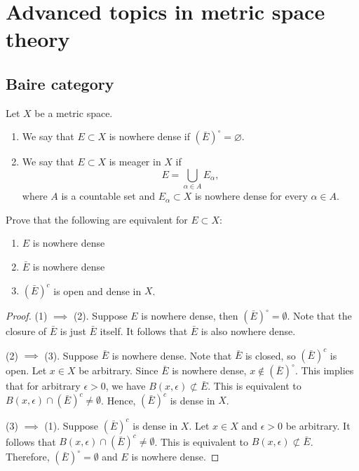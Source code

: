 \documentclass[a4paper]{article}
\begin{document}
\maketitle

\tableofcontents

\section{Advanced topics in metric space theory}

\subsection{Baire category}

\begin{defi}
Let $X$ be a metric space.
\begin{enumerate}
 \item We say that $E \subset X$ is nowhere dense if
 $(\bar{E})^\circ = \varnothing$.
 \item We say that $E \subset X$ is meager in $X$ if
\begin{equation*}
 E = \bigcup_{\alpha \in A} E_\alpha,
\end{equation*}
where $A$ is a countable set and $E_\alpha \subset X$
is nowhere dense for every $\alpha \in A$.
\end{enumerate}
\end{defi}

\begin{thm}
Prove that the following are equivalent for
$E \subset X$:
\begin{enumerate}
 \item $E$ is nowhere dense
 \item $\bar{E}$ is nowhere dense
 \item $(\bar{E})^c$ is open and dense in $X$.
\end{enumerate}
\end{thm}

\begin{proof}
  (1) $\implies$ (2). Suppose $E$ is nowhere dense, then
  $(\bar{E})^\circ = \emptyset$. Note that the closure
  of $\bar{E}$ is just $\bar{E}$ itself. It follows that
  $\bar{E}$ is also nowhere dense.

  (2) $\implies$ (3). Suppose $\bar{E}$ is nowhere dense.
  Note that $\bar{E}$ is closed, so $(\bar{E})^c$ is open.
  Let $x \in X$ be arbitrary. Since $\bar{E}$ is nowhere dense,
  $x \notin (\bar{E})^\circ$. This implies that for arbitrary
  $\epsilon > 0$, we have $B(x, \epsilon) \nsubset \bar{E}$.
  This is equivalent to $B(x, \epsilon) \cap (\bar{E})^c \neq
  \emptyset$. Hence, $(\bar{E})^c$ is dense in $X$.

  (3) $\implies$ (1). Suppose $(\bar{E})^c$ is dense in $X$.
  Let $x \in X$ and $\epsilon > 0$ be arbitrary. It follows
  that $B(x, \epsilon) \cap (\bar{E})^c \neq \emptyset$.
  This is equivalent to $B(x, \epsilon) \nsubset \bar{E}$.
  Therefore, $(\bar{E})^\circ = \emptyset$ and $E$ is nowhere
  dense.

\end{proof}
\end{document}
